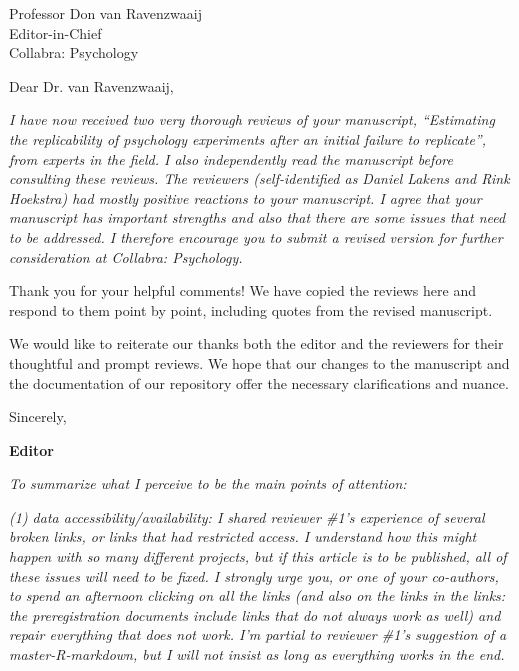 \documentclass{stanfordletter}
\newcounter{section}
\newcommand{\section}[1]{
	\bigskip
	{\normalfont\Large\bfseries #1}}
\newcommand{\theysaid}[1]{\begin{leftbar} \noindent 
		\textsl{ #1}\end{leftbar}}
\begin{document}
	\signature{\vspace{-35pt} Veronica Boyce, \\ on behalf of the author team}
	
	
	\begin{letter}{Professor Don van Ravenzwaaij \\ Editor-in-Chief \\ Collabra: Psychology }
		
		
		\opening{Dear Dr. van Ravenzwaaij,} 
		
		
		
		\theysaid{I have now received two very thorough reviews of your manuscript, “Estimating the replicability of psychology experiments after an initial failure to replicate”, from experts in the field. I also independently read the manuscript before consulting these reviews. The reviewers (self-identified as Daniel Lakens and Rink Hoekstra) had mostly positive reactions to your manuscript. I agree that your manuscript has important strengths and also that there are some issues that need to be addressed. I therefore encourage you to submit a revised version for further consideration at Collabra: Psychology.}
		
		Thank you for your helpful comments! We have copied the reviews here and respond to them point by point, including quotes from the revised manuscript. 
		
		We would like to reiterate our thanks both the editor and the reviewers for their thoughtful and prompt reviews. We hope that our changes to the manuscript and the documentation of our repository offer the necessary clarifications and nuance. 
		
		\closing{Sincerely,}
		
		\pagebreak

	
	\section{Editor}
	
	\theysaid{To summarize what I perceive to be the main points of attention:}
	
	\theysaid{(1) data accessibility/availability: I shared reviewer \#1’s experience of several broken links, or links that had restricted access. I understand how this might happen with so many different projects, but if this article is to be published, all of these issues will need to be fixed. I strongly urge you, or one of your co-authors, to spend an afternoon clicking on all the links (and also on the links in the links: the preregistration documents include links that do not always work as well) and repair everything that does not work. I’m partial to reviewer \#1’s suggestion of a master-R-markdown, but I will not insist as long as everything works in the end.}
	

\end{letter}
\end{document}
